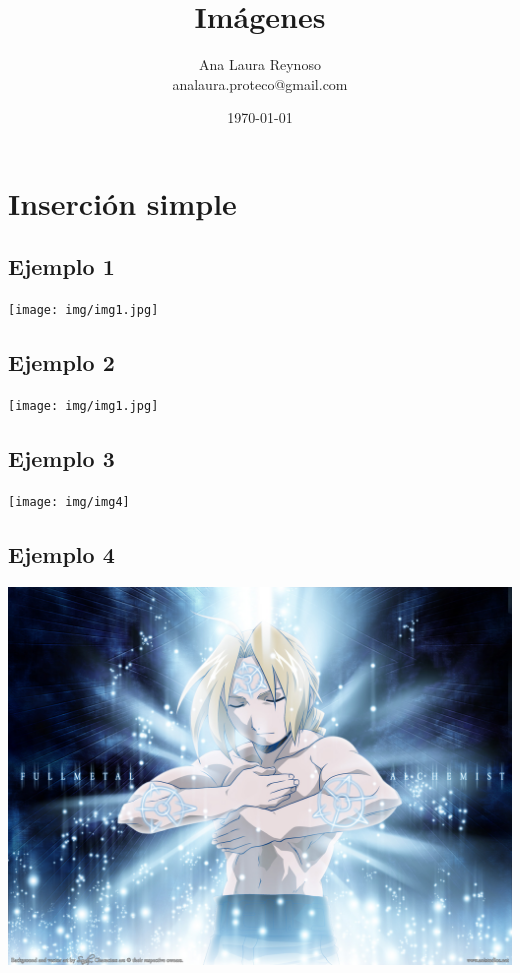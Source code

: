 \documentclass[letterpaper]{article}
\author{Ana Laura Reynoso \\ analaura.proteco@gmail.com}
\title{Imágenes }
\date{\today}
\begin{document}
	\maketitle
	\section{Inserción simple}
	
	\subsection{Ejemplo 1}
	\begin{flushright}
		\texttt{[image: img/img1.jpg]} %
	\end{flushright}
	
	\subsection{Ejemplo 2}
	\texttt{[image: img/img1.jpg]} %
	
	\subsection{Ejemplo 3}
	\texttt{[image: img/img4]}
	
	\subsection{Ejemplo 4}
	\includegraphics[scale=0.2]{img/img7}
	
\end{document}
